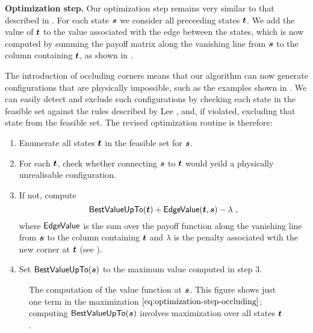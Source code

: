\textbf{Optimization step.} Our optimization step remains very similar
to that described in . For each state $\State$ we
consider all preceeding states $\OtherState$. We add the value of
$\OtherState$ to the value associated with the edge between the
states, which is now computed by summing the payoff matrix along the
vanishing line from $\State$ to the column containing $\OtherState$, as
shown in .

The introduction of occluding corners means that our algorithm can now
generate configurations that are physically impossible, such as the
examples shown in . We can easily
detect and exclude such configurations by checking each state in the
feasible set against the rules described by Lee \etal \cite{Lee09},
and, if violated, excluding that state from the feasible set. The
revised optimization routine is therefore:
\begin{enumerate}
  \item{Enumerate all states $\OtherState$ in the feasible set for
    $\State$.}
  \item{For each $\OtherState$, check whether connecting $\State$ to $\OtherState$
    would yeild a physically unrealisable configuration.}
  \item{If not, compute
    \begin{equation}
      \label{eq:optimization-step-occluding}
      \bestvalue(\OtherState)+\edgevalue(\OtherState,\State)-\lambda ~,
    \end{equation}
    where $\edgevalue$ is the sum over the payoff function along the
    vanishing line from $\State$ to the column containing
    $\OtherState$ and $\lambda$ is the penalty associated wtih the new
    corner at $\OtherState$ (see ).}
  \item{Set $\bestvalue(\State)$ to the maximum value computed in
    step 3.}
\end{enumerate}

\begin{figure}[tb]
  \centering
  \caption{The computation of the value function at $\State$. This
    figure shows just one term in the maximization
    $\eqnref{optimization-step-occluding}$; computing $\bestvalue(\State)$
    involves maximization over all states $\OtherState$.}
  \label{fig:recurrence-value-occluding}
\end{figure}

